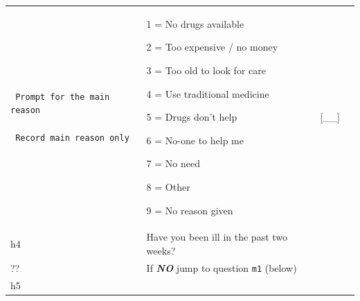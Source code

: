 \documentclass[12pt,a4paper]{book}
\theoremstyle{definition}
\theoremstyle{definition}
\theoremstyle{definition}
\theoremstyle{remark}
\begin{document}
\begin{longtable}[]{@{}llll@{}}
\begin{minipage}[t]{0.24\columnwidth}
\begin{verbatim}
 Prompt for the main reason

 Record main reason only
\end{verbatim}
\strut
\end{minipage} & \begin{minipage}[t]{0.24\columnwidth}\raggedright
1 = No drugs available

2 = Too expensive / no money

3 = Too old to look for care

4 = Use traditional medicine

5 = Drugs don't help

6 = No-one to help me

7 = No need

8 = Other

9 = No reason given\strut
\end{minipage} & \begin{minipage}[t]{0.24\columnwidth}\raggedright
{[}\_\_{]}\strut
\end{minipage}\tabularnewline
\begin{minipage}[t]{0.09\columnwidth}\raggedright
h4\strut
\end{minipage} & \begin{minipage}[t]{0.41\columnwidth}\raggedright
Have you been ill in the past two weeks?\strut
\end{minipage} & \begin{minipage}[t]{0.25\columnwidth}\raggedright
\strut
\end{minipage} & \begin{minipage}[t]{0.13\columnwidth}\raggedright
\strut
\end{minipage}\tabularnewline
\begin{minipage}[t]{0.09\columnwidth}\raggedright
??\strut
\end{minipage} & \begin{minipage}[t]{0.41\columnwidth}\raggedright
If \textbf{\emph{NO}} jump to question \texttt{m1} (below)\strut
\end{minipage} & \begin{minipage}[t]{0.25\columnwidth}\raggedright
\strut
\end{minipage} & \begin{minipage}[t]{0.13\columnwidth}\raggedright
\strut
\end{minipage}\tabularnewline
\begin{minipage}[t]{0.09\columnwidth}\raggedright
h5\strut
\end{minipage} & \begin{minipage}[t]{0.41\columnwidth}\raggedright

\end{minipage}
\end{longtable}
\end{document}
